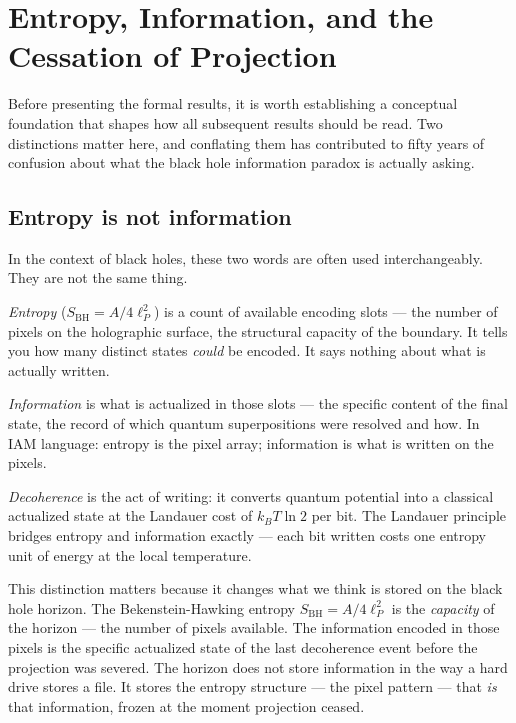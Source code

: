 \documentclass[12pt,letterpaper]{article}
\begin{document}
\section{Entropy, Information, and the Cessation of Projection}

Before presenting the formal results, it is worth establishing
a conceptual foundation that shapes how all subsequent results
should be read. Two distinctions matter here, and conflating
them has contributed to fifty years of confusion about what
the black hole information paradox is actually asking.

\subsection{Entropy is not information}

In the context of black holes, these two words are often used
interchangeably. They are not the same thing.

\emph{Entropy} ($S_\text{BH} = A/4\ell_P^2$) is a count of
available encoding slots --- the number of pixels on the
holographic surface, the structural capacity of the boundary.
It tells you how many distinct states \emph{could} be encoded.
It says nothing about what is actually written.

\emph{Information} is what is actualized in those slots ---
the specific content of the final state, the record of which
quantum superpositions were resolved and how.
In IAM language: entropy is the pixel array; information is
what is written on the pixels.

\emph{Decoherence} is the act of writing: it converts quantum
potential into a classical actualized state at the Landauer
cost of $k_B T \ln 2$ per bit.
The Landauer principle bridges entropy and information exactly ---
each bit written costs one entropy unit of energy at the
local temperature.

This distinction matters because it changes what we think
is stored on the black hole horizon.
The Bekenstein-Hawking entropy $S_\text{BH} = A/4\ell_P^2$
is the \emph{capacity} of the horizon --- the number of pixels
available. The information encoded in those pixels is the
specific actualized state of the last decoherence event
before the projection was severed.
The horizon does not store information in the way a hard drive
stores a file. It stores the entropy structure --- the pixel
pattern --- that \emph{is} that information, frozen at the
moment projection ceased.
\end{document}
